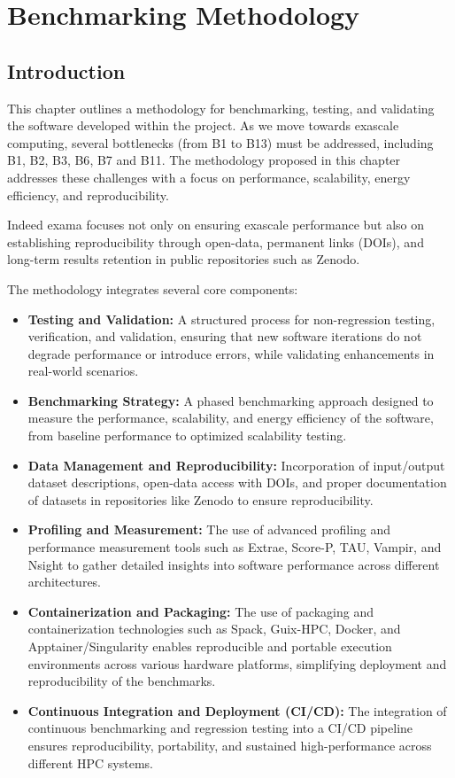 
\chapter{Benchmarking Methodology}
\label{chap:methodology}

\section{Introduction}
\label{sec:methodology-intro}


This chapter outlines a methodology for benchmarking, testing, and validating the software developed within the \exama project. 
As we move towards exascale computing, several bottlenecks (from \ac{B1} to \ac{B13}) must be addressed, including \ac{B1}, \ac{B2}, \ac{B3}, \ac{B6}, \ac{B7} and \ac{B11}. 
The methodology proposed in this chapter addresses these challenges with a focus on performance, scalability, energy efficiency, and reproducibility. 

Indeed \ac{exama} focuses not only on ensuring exascale performance but also on establishing reproducibility through open-data, permanent links (DOIs), and long-term results retention in public repositories such as Zenodo. 

The methodology integrates several core components:
\begin{itemize}
    \item \textbf{Testing and Validation:} A structured process for non-regression testing, verification, and validation, ensuring that new software iterations do not degrade performance or introduce errors, while validating enhancements in real-world scenarios.
    \item \textbf{Benchmarking Strategy:} A phased benchmarking approach designed to measure the performance, scalability, and energy efficiency of the software, from baseline performance to optimized scalability testing.
    \item \textbf{Data Management and Reproducibility:} Incorporation of input/output dataset descriptions, open-data access with DOIs, and proper documentation of datasets in repositories like Zenodo to ensure reproducibility.
    \item \textbf{Profiling and Measurement:} The use of advanced profiling and performance measurement tools such as Extrae, Score-P, TAU, Vampir, and Nsight to gather detailed insights into software performance across different architectures.
    \item \textbf{Containerization and Packaging:} The use of packaging and containerization technologies such as Spack, Guix-HPC, Docker, and Apptainer/Singularity enables reproducible and portable execution environments across various hardware platforms, simplifying deployment and reproducibility of the benchmarks.
    \item \textbf{Continuous Integration and Deployment (CI/CD):} The integration of continuous benchmarking and regression testing into a CI/CD pipeline ensures reproducibility, portability, and sustained high-performance across different HPC systems.
\end{itemize}

